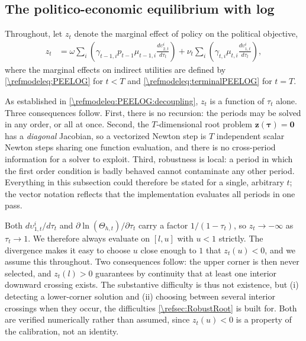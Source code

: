 \subsection{The politico-economic equilibrium with log}\label{\refsec:PEELOG}
Throughout, let $z_t$ denote the marginal effect of policy on the political objective,
\begin{align}\label{\refeq:LOG:foc}
    z_t &= \omega\sum_{i}\left(\gamma_{t-1,i}p_{t-1}\mu_{t-1,i} \frac{d\upsilon_{2,t}^i}{d\tau_t}\right)+\nu_t\sum_i\left(\gamma_{t,i}\mu_{t,i} \frac{d\upsilon_{1,t}^i}{d\tau_t}\right),
\end{align}
where the marginal effects on indirect utilities are defined by \eqref{\refmodeleq:PEELOG} for $t<T$ and \eqref{\refmodeleq:terminalPEELOG} for $t=T$.

As established in \eqref{\refmodeleq:PEELOG:decoupling}, $z_t$ is a function of $\tau_t$ alone. Three consequences follow. First, there is no recursion: the periods may be solved in any order, or all at once. Second, the $T$-dimensional root problem $\bm{z}(\bm{\tau}) = \bm{0}$ has a \emph{diagonal} Jacobian, so a vectorized Newton step is $T$ independent scalar Newton steps sharing one function evaluation, and there is no cross-period information for a solver to exploit. Third, robustness is local: a period in which the first order condition is badly behaved cannot contaminate any other period. Everything in this subsection could therefore be stated for a single, arbitrary $t$; the vector notation reflects that the implementation evaluates all periods in one pass.

Both $d\upsilon_{1,t}^i/d\tau_t$ and $\partial \ln(\Theta_{h,t})/\partial\tau_t$ carry a factor $1/(1-\tau_t)$, so $z_t\rightarrow -\infty$ as $\tau_t\rightarrow 1$. We therefore always evaluate on $[l,u]$ with $u<1$ strictly. The divergence makes it easy to choose $u$ close enough to $1$ that $z_t(u)<0$, and we assume this throughout. Two consequences follow: the upper corner is then never selected, and $z_t(l)>0$ guarantees by continuity that at least one interior downward crossing exists. The substantive difficulty is thus not existence, but (i) detecting a lower-corner solution and (ii) choosing between several interior crossings when they occur, the difficulties \cref{\refsec:RobustRoot} is built for. Both are verified numerically rather than assumed, since $z_t(u)<0$ is a property of the calibration, not an identity.

